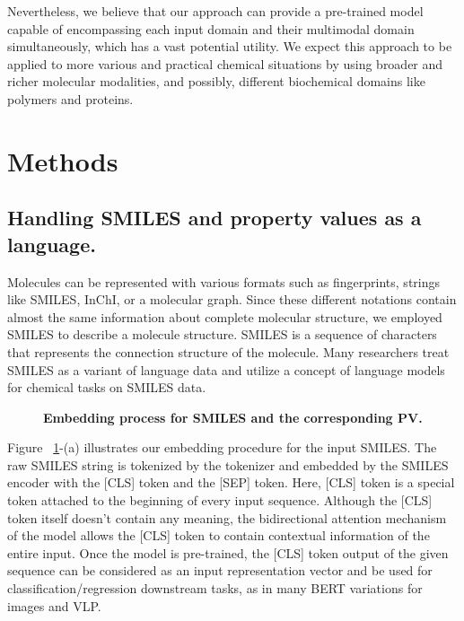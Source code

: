 \documentclass{nature_meth}
\newcommand{\1}{\blmath{1}}
\newcommand{\0}{\blmath{0}}
\begin{document}
Nevertheless, we believe that our approach can provide a pre-trained model capable of encompassing each input domain and their multimodal domain simultaneously, which has a vast potential utility.
We expect this approach to be applied to more various and practical chemical situations by using broader and richer molecular modalities, and possibly, different biochemical domains like polymers and proteins.


\section*{Methods}

\subsection{Handling SMILES and property values as a language.}
Molecules can be represented with various formats such as fingerprints, strings like SMILES, InChI, or a molecular graph. Since these different notations contain almost the same information about complete molecular structure, we employed SMILES to describe a molecule structure. SMILES is a sequence of characters that represents the connection structure of the molecule. Many researchers treat SMILES as a variant of language data and utilize a concept of language models for chemical tasks on SMILES data\cite{denovo_transformer,chemberta2,deepdl}.

\begin{figure}[!t]
	\centering
 \centerline{}
	\caption{\bf\footnotesize 
Embedding process for SMILES and the corresponding PV.}
	\label{method2}
\end{figure}

Figure ~\ref{method2}-(a) illustrates our embedding procedure for the input SMILES. The raw SMILES string is tokenized by the tokenizer and embedded by the SMILES encoder with the [CLS] token and the [SEP] token. 
Here, [CLS] token is a special token attached to the beginning of every input sequence\cite{bert}. Although the [CLS] token itself doesn’t contain any meaning, the bidirectional attention mechanism of the model allows the [CLS] token to contain contextual information of the entire input. Once the model is pre-trained, the [CLS] token output of the given sequence can be considered as an input representation vector and be used for classification/regression downstream tasks, as in many BERT variations for images\cite{dino, vit} and VLP\cite{albef}.
\end{document}
